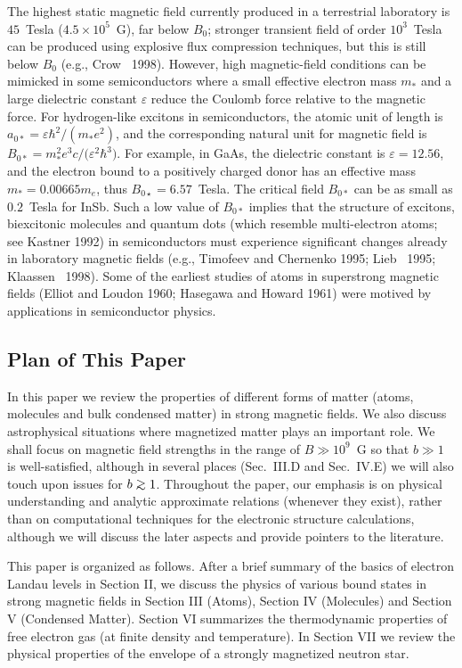 The highest static magnetic field currently produced in a terrestrial
laboratory is $45$~Tesla ($4.5\times 10^5$~G), far below $B_0$;
stronger transient field of order $10^3$~Tesla can be produced using 
explosive flux compression techniques, but this is still below $B_0$
(e.g., Crow \etal~1998). However, high magnetic-field conditions can be
mimicked in some semiconductors where a small effective electron mass
$m_{\ast}$ and a large dielectric constant $\varepsilon$ 
reduce the Coulomb force relative to the magnetic force. For
hydrogen-like excitons in semiconductors, the atomic unit of length
is $a_{0\ast}=\varepsilon\hbar^2/(m_\ast e^2)$, and the corresponding
natural unit for magnetic field is $B_{0\ast}={m_{\ast}^2e^3c/
({\varepsilon}^2\hbar^3})$. For example, in GaAs, the dielectric constant is
$\varepsilon=12.56$, and the electron bound to a positively charged donor has
an effective mass $m_{\ast}=0.00665m_e$, thus $B_{0\star}=6.57$~Tesla. The
critical field $B_{0\ast}$ can be as small as $0.2$~Tesla for InSb.
Such a low value of $B_{0\ast}$ implies that the structure of excitons, 
biexcitonic molecules and quantum dots (which resemble multi-electron
atoms; see Kastner 1992) in semiconductors must experience significant changes
already in laboratory magnetic fields (e.g., Timofeev and Chernenko 1995; 
Lieb \etal~1995; Klaassen \etal~1998). Some of the 
earliest studies of atoms in superstrong magnetic fields (Elliot 
and Loudon 1960; Hasegawa and Howard 1961) were motived by applications
in semiconductor physics. 


\subsection{Plan of This Paper}

In this paper we review the properties of different forms of
matter (atoms, molecules and bulk condensed matter) in strong magnetic fields. 
We also discuss astrophysical situations where magnetized matter 
plays an important role. 
We shall focus on magnetic field strengths in the range of $B\gg
10^{9}$~G so that $b\gg 1$ is well-satisfied, although in several places
(Sec.~III.D and Sec.~IV.E) we will also touch upon issues for $b\go 1$. 
Throughout the paper, our emphasis is on physical understanding and 
analytic approximate relations (whenever they exist), 
rather than on computational techniques for the electronic
structure calculations, although we will discuss the later aspects and provide
pointers to the literature. 

This paper is organized as follows. After a brief summary of
the basics of electron Landau levels in Section II, we discuss the 
physics of various bound states in strong magnetic fields
in Section III (Atoms), Section IV (Molecules) and Section V 
(Condensed Matter). Section VI summarizes the thermodynamic
properties of free electron gas (at finite density and temperature). 
In Section VII we review the physical properties of the envelope of
a strongly magnetized neutron star. 

